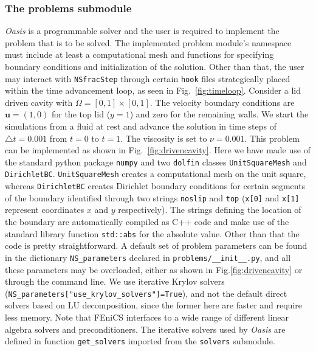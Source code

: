 \documentclass[final,3p,times,twocolumn]{elsarticle}
\newcommand{\inpyth}{\lstinline[style=inlinestyle]} %[]%
\begin{document}
\subsubsection*{The problems submodule}

\emph{Oasis} is a programmable solver and the user is required to implement the problem that is to be solved. The implemented problem module's namespace must include at least a computational mesh and functions for specifying boundary conditions and initialization of the solution. Other than that, the user may interact with \inpyth{NSfracStep} through certain \inpyth{hook} files strategically placed within the time advancement loop, as seen in Fig.~\ref{fig:timeloop}. Consider a lid driven cavity with $\Omega = [0, 1]\times[0, 1]$. The velocity boundary conditions are $\bm{u} = (1, 0)$ for the top lid ($y=1$) and zero for the remaining walls. We start the simulations from a fluid at rest and advance the solution in time steps of $\triangle t=0.001$ from $t=0$ to $t=1$. The viscosity is set to $\nu=0.001$. This problem can be implemented as shown in Fig.~\ref{fig:drivencavity}. Here we have made use of the standard python package \inpyth{numpy} and two \inpyth{dolfin} classes \inpyth{UnitSquareMesh} and \inpyth{DirichletBC}. \inpyth{UnitSquareMesh} creates a computational mesh on the unit square, whereas   \inpyth{DirichletBC} creates Dirichlet boundary conditions for certain segments of the boundary identified through two strings \inpyth{noslip} and \inpyth{top} (\inpyth{x[0]} and \inpyth{x[1]} represent coordinates $x$ and $y$ respectively). The strings defining the location of the boundary are automatically compiled as C++ code and make use of the standard library function \inpyth{std::abs} for the absolute value. Other than that the code is pretty straightforward. A default set of problem parameters can be found in the dictionary \inpyth{NS_parameters} declared in \inpyth{problems/__init__.py}, and all these parameters may be overloaded, either as shown in Fig.\ref{fig:drivencavity} or through the command line. We use iterative Krylov solvers (\inpyth{NS_parameters["use_krylov_solvers"]=True}), and not the default direct solvers based on LU decomposition, since the former here are faster and require less memory. Note that FEniCS interfaces to a wide range of different linear algebra solvers and preconditioners. The iterative solvers used by \emph{Oasis} are defined in function \inpyth{get_solvers} imported from the \inpyth{solvers} submodule.
\end{document}
